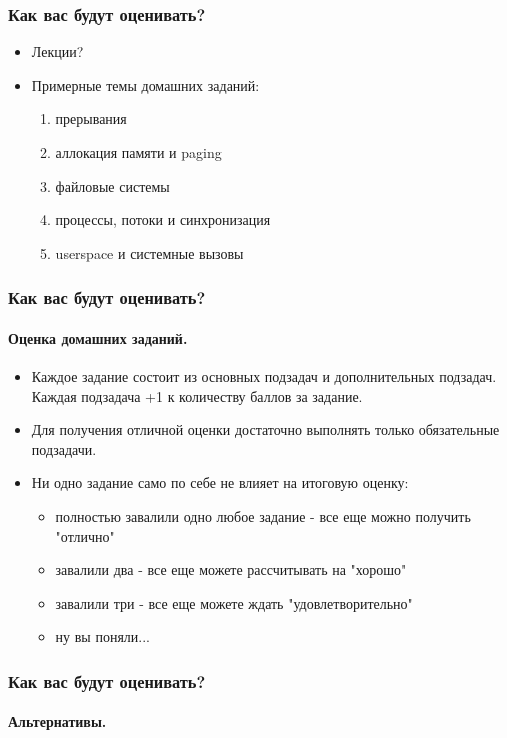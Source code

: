 \begin{frame}
\frametitle{Как вас будут оценивать?}

\begin{itemize}
  \item<1-> Лекции?  
  \item<4-> Примерные темы домашних заданий:
    \begin{enumerate}
      \item<5-> прерывания
      \item<6-> аллокация памяти и paging
      \item<7-> файловые системы
      \item<8-> процессы, потоки и синхронизация
      \item<9-> userspace и системные вызовы
    \end{enumerate}
\end{itemize}
\end{frame}

\begin{frame}
\frametitle{Как вас будут оценивать?}
\framesubtitle{Оценка домашних заданий.}

\begin{itemize}
  \item<1-> Каждое задание состоит из основных подзадач и дополнительных
            подзадач. Каждая подзадача +1 к количеству баллов за задание.
  \item<2-> Для получения отличной оценки достаточно выполнять только
            обязательные подзадачи.
  \item<3-> Ни одно задание само по себе не влияет на итоговую оценку:
    \begin{itemize}
      \item<4-> полностью завалили одно любое задание - все еще можно получить
                "отлично"
      \item<5-> завалили два - все еще можете рассчитывать на "хорошо"
      \item<6-> завалили три - все еще можете ждать "удовлетворительно"
      \item<7-> ну вы поняли...
    \end{itemize}
\end{itemize}
\end{frame}

\begin{frame}
\frametitle{Как вас будут оценивать?}
\framesubtitle{Альтернативы.}

\end{frame}
